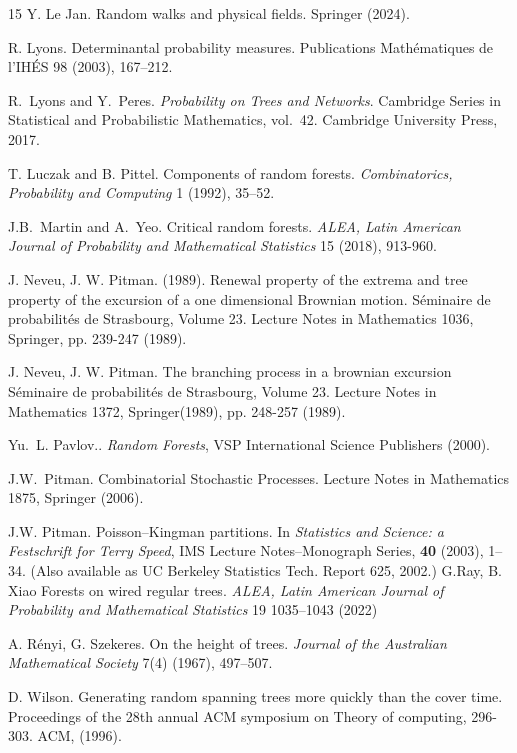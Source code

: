 \documentclass[11pt]{article}
\begin{document}
\begin{thebibliography}{15}
  Y. Le Jan. Random walks and physical fields. Springer (2024).
 
R. Lyons. Determinantal probability measures.
Publications Mathématiques de l'IHÉS 98 (2003), 167--212.

R.~Lyons and Y.~Peres.
\emph{Probability on Trees and Networks}.
Cambridge Series in Statistical and Probabilistic Mathematics, vol.~42.
Cambridge University Press, 2017.

T. Luczak and B. Pittel.
Components of random forests.
\emph{Combinatorics, Probability and Computing} 1 (1992), 35--52.

J.B.~Martin and A.~Yeo.
Critical random forests.
\emph{ALEA, Latin American Journal of Probability and Mathematical Statistics} 15 (2018), 913-960.


 
 J. Neveu, J. W. Pitman. (1989). Renewal property of the extrema and tree property of the excursion of a one dimensional Brownian motion. Séminaire de probabilités de Strasbourg, Volume 23. Lecture Notes in Mathematics 1036, Springer, pp. 239-247 (1989).
  
 J. Neveu, J. W. Pitman. The branching process in a brownian excursion
Séminaire de probabilités de Strasbourg, Volume 23.  Lecture Notes in Mathematics 1372, Springer(1989), pp. 248-257  (1989).

Yu.~L. Pavlov..
\emph{Random Forests},
VSP International Science Publishers (2000).



J.W.~Pitman.
Combinatorial Stochastic Processes.
Lecture Notes in Mathematics 1875, Springer (2006).


J.W. Pitman.
\newblock Poisson--Kingman partitions.
\newblock In \emph{Statistics and Science: a Festschrift for Terry Speed},
  IMS Lecture Notes--Monograph Series, \textbf{40} (2003), 1--34.
\newblock (Also available as UC Berkeley Statistics Tech. Report 625, 2002.)
G.Ray, B. Xiao 
Forests on wired regular trees.
\emph{ALEA, Latin American Journal of Probability and Mathematical Statistics} 19 1035–1043 (2022)


%
 A. Rényi, G. Szekeres.  
On the height of trees.
\emph{Journal of the Australian Mathematical Society} 7(4) (1967), 497--507.

 D. Wilson. Generating random spanning trees more quickly than the cover time.
Proceedings of the 28th annual ACM symposium on Theory of computing, 296-303. ACM, (1996).


\end{thebibliography}
\end{document}
